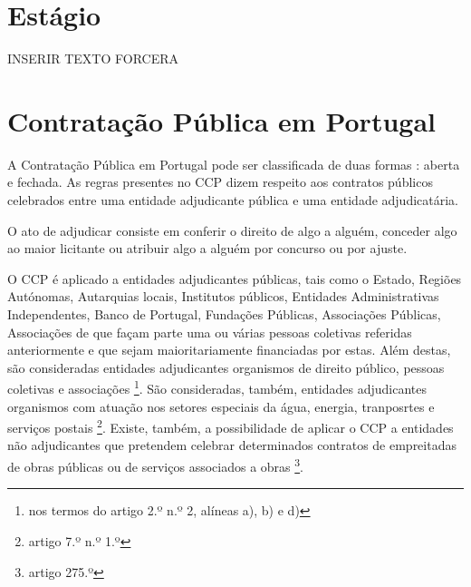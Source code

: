 \section{Estágio}

INSERIR TEXTO FORCERA

\section{Contratação Pública em Portugal}

A Contratação Pública em Portugal pode ser classificada de duas formas : aberta e fechada. As regras presentes no CCP dizem respeito aos contratos públicos celebrados entre uma entidade adjudicante pública e uma entidade adjudicatária.



O ato de adjudicar consiste em conferir o direito de algo a alguém, conceder algo ao maior licitante ou atribuir algo a alguém por concurso ou por ajuste. 

O CCP é aplicado a entidades adjudicantes públicas, tais como o Estado, Regiões Autónomas, Autarquias locais, Institutos públicos, Entidades Administrativas Independentes, Banco de Portugal, Fundações Públicas, Associações Públicas, Associações de que façam parte uma ou várias pessoas coletivas referidas anteriormente e que sejam maioritariamente financiadas por estas. Além destas, são consideradas entidades adjudicantes organismos de direito público, pessoas coletivas e associações \footnote{nos termos do artigo 2.º n.º 2, alíneas a), b) e d)}. São consideradas, também, entidades adjudicantes organismos com atuação nos setores especiais da água, energia, tranposrtes e serviços postais \footnote{artigo 7.º n.º 1.º}. Existe, também, a possibilidade de aplicar o CCP a entidades não adjudicantes que pretendem celebrar determinados contratos de empreitadas de obras públicas ou de serviços associados a obras \footnote{artigo 275.º}.




